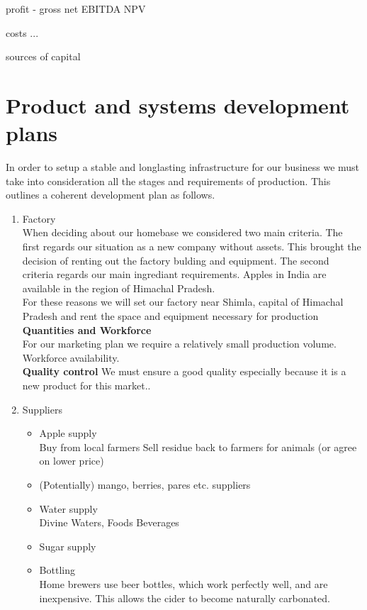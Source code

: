 \documentclass{article}
\begin{document}
profit
 - gross
   net
   EBITDA
   NPV

costs
 ...

sources of capital
\section{Product and systems development plans}
In order to setup a stable and longlasting infrastructure for our business we must take into consideration all the stages and requirements of production. This outlines a coherent development plan as follows.

	\begin{enumerate}
	\item Factory \\
When deciding about our homebase we considered two main criteria. The first regards our situation as a new company without assets. This brought the decision of renting out the factory bulding and equipment. The second criteria regards our main ingrediant requirements. Apples in India are available in the region of Himachal Pradesh. \\

For these reasons we will set our factory near Shimla, capital of Himachal Pradesh and rent the space and equipment necessary for production \\

\textbf{Quantities and Workforce} \\
For our marketing plan we require a relatively small production volume.\\
Workforce availability. \\

\textbf{Quality control}
We must ensure a good quality especially because it is a new product for this market..

	\item Suppliers
		\begin{itemize}
		\item Apple supply \\
			Buy from local farmers %
        	Sell residue back to farmers for animals (or agree on lower price)
		\item (Potentially) mango, berries, pares etc. suppliers
		\item Water supply \\
			Divine Waters, Foods Beverages
		\item Sugar supply %
		\item Bottling \\
			Home brewers use beer bottles, which work perfectly well, and are inexpensive. This allows the cider to become naturally carbonated.
		\end{itemize}
			

\end{enumerate}
\end{document}
